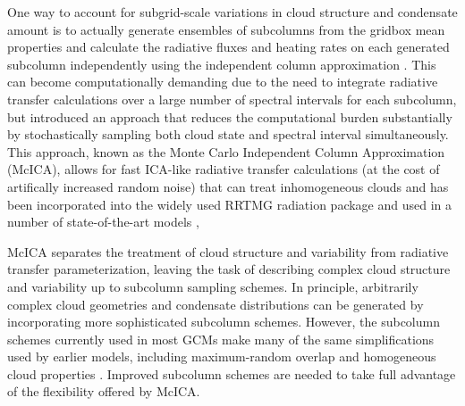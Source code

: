 One way to account for subgrid-scale variations in cloud structure and condensate amount is to actually generate ensembles of subcolumns from the gridbox mean properties and calculate the radiative fluxes and heating rates on each generated subcolumn independently using the independent column approximation \citep[ICA;][]{cahalan_et_al_1994}. This can become computationally demanding due to the need to integrate radiative transfer calculations over a large number of spectral intervals for each subcolumn, but \cite{pincus_et_al_2003} introduced an approach that reduces the computational burden substantially by stochastically sampling both cloud state and spectral interval simultaneously. This approach, known as the Monte Carlo Independent Column Approximation (McICA), allows for fast ICA-like radiative transfer calculations (at the cost of artifically increased random noise) that can treat inhomogeneous clouds and has been incorporated into the widely used RRTMG radiation package and used in a number of state-of-the-art models \citep{iacono_et_al_2008,von_salzen_et_al_2012,neale_et_al_2010a,neale_et_al_2010b,donner_et_al_2011,navgem_description},

McICA separates the treatment of cloud structure and variability from radiative transfer parameterization, leaving the task of describing complex cloud structure and variability up to subcolumn sampling schemes. In principle, arbitrarily complex cloud geometries and condensate distributions can be generated by incorporating more sophisticated subcolumn schemes. However, the subcolumn schemes currently used in most GCMs make many of the same simplifications used by earlier models, including maximum-random overlap and homogeneous cloud properties \citep[e.g.,][]{neale_et_al_2010a, neale_et_al_2010b}. Improved subcolumn schemes are needed to take full advantage of the flexibility offered by McICA.

